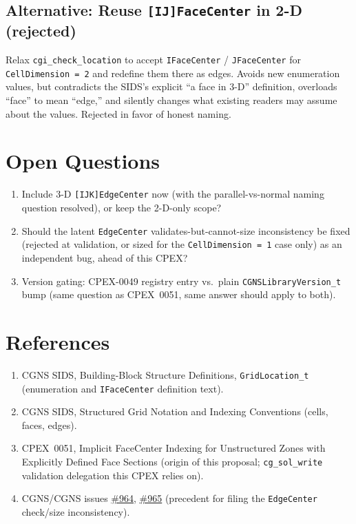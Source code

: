 \documentclass[11pt,letterpaper]{article}
\begin{document}
\subsection{Alternative: Reuse \texttt{[IJ]FaceCenter} in 2-D (rejected)}

Relax \texttt{cgi\_check\_location} to accept \texttt{IFaceCenter} /
\texttt{JFaceCenter} for \texttt{CellDimension~=~2} and redefine them
there as edges. Avoids new enumeration values, but
contradicts the SIDS's explicit ``a face in 3-D'' definition, overloads
``face'' to mean ``edge,'' and silently changes what existing readers
may assume about the values. Rejected in favor of honest naming.

\section{Open Questions}

\begin{enumerate}[leftmargin=2em]
\item Include 3-D \texttt{[IJK]EdgeCenter} now (with the
  parallel-vs-normal naming question resolved), or keep the 2-D-only
  scope?
\item Should the latent \texttt{EdgeCenter}
  validates-but-cannot-size inconsistency be fixed (rejected at
  validation, or sized for the \texttt{CellDimension~=~1} case only)
  as an independent bug, ahead of this CPEX?
\item Version gating: CPEX-0049 registry entry vs.\ plain
  \texttt{CGNSLibraryVersion\_t} bump (same question as CPEX~0051,
  same answer should apply to both).
\end{enumerate}

\section{References}

\begin{enumerate}[leftmargin=2em]
\item CGNS SIDS, Building-Block Structure Definitions,
  \texttt{GridLocation\_t} (enumeration and \texttt{IFaceCenter}
  definition text).
\item CGNS SIDS, Structured Grid Notation and Indexing Conventions
  (cells, faces, edges).
\item CPEX~0051, Implicit FaceCenter Indexing for Unstructured Zones
  with Explicitly Defined Face Sections (origin of this proposal;
  \texttt{cg\_sol\_write} validation delegation this CPEX relies on).
\item CGNS/CGNS issues
  \href{https://github.com/CGNS/CGNS/issues/964}{\#964},
  \href{https://github.com/CGNS/CGNS/issues/965}{\#965} (precedent for
  filing the \texttt{EdgeCenter} check/size inconsistency).
\end{enumerate}
\end{document}
